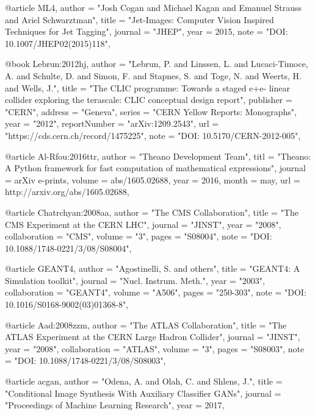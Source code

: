 @article{
    ML4,
    author  = "Josh Cogan and Michael Kagan and Emanuel Strauss and Ariel Schwarztman",
    title   = "Jet-Images: Computer Vision Inspired Techniques for Jet Tagging",
    journal = "JHEP",
    year    = 2015,
    note    = "DOI: 10.1007/JHEP02(2015)118",
}

@book{
	Lebrun:2012hj,
    author        = "Lebrun, P. and Linssen, L. and Lucaci-Timoce, A. and Schulte, D. and Simon, F. and Stapnes, S. and Toge, N. and Weerts, H. and Wells, J.",
    title         = "{The CLIC programme: Towards a staged e+e- linear collider exploring the terascale: CLIC conceptual design report}",
    publisher     = "CERN",
    address       = "Geneva",
    series        = "CERN Yellow Reports: Monographs",
    year          = "2012",
    reportNumber  = "arXiv:1209.2543",
    url           = "https://cds.cern.ch/record/1475225",
    note          = "DOI: 10.5170/CERN-2012-005",
}

@article{
	Al-Rfou:2016ttr,
    author  = "Theano Development Team",
    titl    = "{Theano: A {Python} framework for fast computation of mathematical expressions}",
    journal = {arXiv e-prints},
    volume  = {abs/1605.02688},
    year    = 2016,
    month   = may,
    url     = {http://arxiv.org/abs/1605.02688},
}

@article{
	Chatrchyan:2008aa,
    author  = "The CMS Collaboration",
    title   = "The CMS Experiment at the CERN LHC",
    journal = "JINST",
    year    = "2008",
    collaboration   = "CMS",
    volume  = "3",
    pages   = "S08004",
    note    = "DOI: 10.1088/1748-0221/3/08/S08004",
}

@article{
	GEANT4,
    author  = "Agostinelli, S. and others",
    title   = "GEANT4: A Simulation toolkit",
    journal = "Nucl. Instrum. Meth.",
    year    = "2003",
    collaboration   = "GEANT4",
    volume  = "A506",
    pages   = "250-303",
    note    = "DOI: 10.1016/S0168-9002(03)01368-8",
}

@article{
	Aad:2008zzm,
    author  = "The ATLAS Collaboration",
    title   = "The ATLAS Experiment at the CERN Large Hadron Collider",
    journal = "JINST",
    year    = "2008",
    collaboration   = "ATLAS",
    volume  = "3",
    pages   = "S08003",
    note    = "DOI: 10.1088/1748-0221/3/08/S08003",
}

@article{
    acgan,
    author  = "Odena, A. and Olah, C. and Shlens, J.",
    title   = "Conditional Image Synthesis With Auxiliary Classifier GANs",
    journal = "Proceedings of Machine Learning Research",
    year    = 2017,
}

